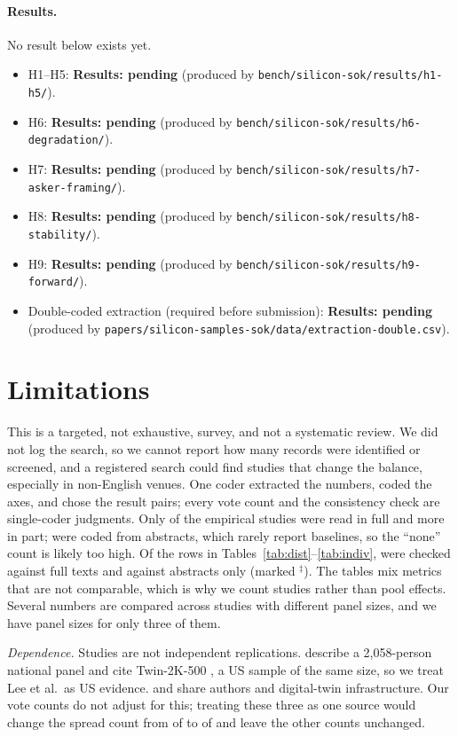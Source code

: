 \documentclass[11pt]{article}
\newcommand{\pending}[1]{\textbf{Results: pending} (produced by \nolinkurl{#1}).}
\newcommand{\ab}{$^\ddagger$}
\begin{document}
\paragraph{Results.} No result below exists yet.
\begin{itemize}
  \item H1--H5: \pending{bench/silicon-sok/results/h1-h5/}
  \item H6: \pending{bench/silicon-sok/results/h6-degradation/}
  \item H7: \pending{bench/silicon-sok/results/h7-asker-framing/}
  \item H8: \pending{bench/silicon-sok/results/h8-stability/}
  \item H9: \pending{bench/silicon-sok/results/h9-forward/}
  \item Double-coded extraction (required before submission): \pending{papers/silicon-samples-sok/data/extraction-double.csv}
\end{itemize}

\section{Limitations}
\label{sec:limits}

This is a targeted, not exhaustive, survey, and not a systematic review. We did not log the search, so we cannot report how many records were identified or screened, and a registered search could find studies that change the balance, especially in non-English venues. One coder extracted the numbers, coded the axes, and chose the result pairs; every vote count and the consistency check are single-coder judgments. Only \cEmpFull{} of the \cEmp{} empirical studies were read in full and \cEmpPartial{} more in part; \cEmpAbstract{} were coded from abstracts, which rarely report baselines, so the ``none'' count is likely too high. Of the \cRows{} rows in Tables~\ref{tab:dist}--\ref{tab:indiv}, \cRowsFull{} were checked against full texts and \cRowsAbstract{} against abstracts only (marked \ab). The tables mix metrics that are not comparable, which is why we count studies rather than pool effects. Several numbers are compared across studies with different panel sizes, and we have panel sizes for only three of them.

\emph{Dependence.} Studies are not independent replications. \citet{lee2026openweight} describe a 2,058-person national panel and cite Twin-2K-500 \citep{toubia2025twin}, a US sample of the same size, so we treat Lee et al.\ as US evidence. \citet{peng2025funhouse} and \citet{toubia2025twin} share authors and digital-twin infrastructure. Our vote counts do not adjust for this; treating these three as one source would change the spread count from \cSpreadLower{} of \cSpread{} to \cSpreadDedupLower{} of \cSpreadDedup{} and leave the other counts unchanged.
\end{document}
